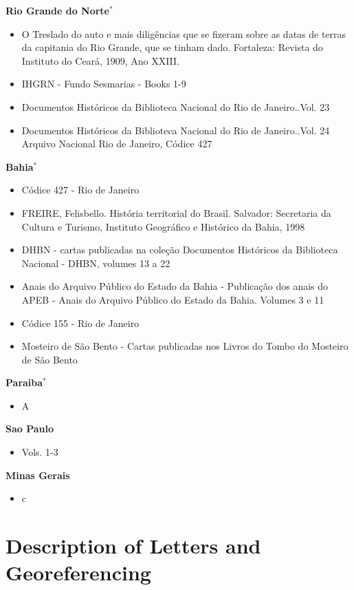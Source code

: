 \documentclass{article}
\begin{document}
\textbf{Rio Grande do Norte$^*$}
\begin{itemize}
  \item O Treslado do auto e mais diligências que se fizeram sobre as datas de terras da capitania do Rio Grande, que se tinham dado. Fortaleza: Revista do Instituto do Ceará, 1909, Ano XXIII.
  \item IHGRN - Fundo Sesmarias - Books 1-9
  \item Documentos Históricos da Biblioteca Nacional do Rio de Janeiro..Vol. 23
  \item Documentos Históricos da Biblioteca Nacional do Rio de Janeiro..Vol. 24 Arquivo Nacional Rio de Janeiro, Códice 427
\end{itemize}

\textbf{Bahia$^*$}
\begin{itemize}
  \item Códice 427 - Rio de Janeiro
  \item FREIRE, Felisbello. História territorial do Brasil. Salvador: Secretaria da Cultura e Turismo, Instituto Geográfico e Histórico da Bahia, 1998
  \item DHBN - cartas publicadas na coleção Documentos Históricos da Biblioteca Nacional - DHBN, volumes 13 a 22
  \item  Anais do Arquivo Público do Estado da Bahia - Publicação dos anais do APEB - Anais do Arquivo Público do Estado da Bahia. Volumes 3 e 11
  \item Códice 155 - Rio de Janeiro
  \item Mosteiro de São Bento - Cartas publicadas nos Livros do Tombo do Mosteiro de São Bento  
\end{itemize}

\textbf{Paraiba$^*$}
\begin{itemize}
\item A
\end{itemize}


\textbf{Sao Paulo}
\begin{itemize}
\item \textcite{noauthor_1921-qd} Vols. 1-3 
\end{itemize}

\textbf{Minas Gerais}
\begin{itemize}
\item c 
\end{itemize}

\clearpage

\section{Description of Letters and Georeferencing}
\label{app:appendix_data}
\clearpage
\end{document}

